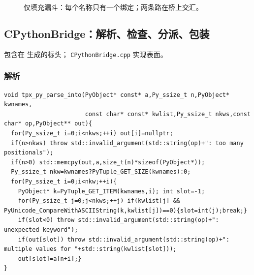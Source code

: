 \begin{figure}[H]
\centering
{}
\caption{仅填充漏斗：每个名称只有一个绑定；两条路在桥上交汇。}
\label{fig:dualfunnel}
\end{figure}

\subsection{CPythonBridge：解析、检查、分派、包装}
\label{sec:bridge}

包含在
生成的标头； \texttt{CPythonBridge.cpp} 实现表面。

\subsubsection{解析}

\begin{lstlisting}[caption={zero-alloc merge.}, label=lst:parseinto]
void tpx_py_parse_into(PyObject* const* a,Py_ssize_t n,PyObject* kwnames,
                       const char* const* kwlist,Py_ssize_t nkws,const char* op,PyObject** out){
  for(Py_ssize_t i=0;i<nkws;++i) out[i]=nullptr;
  if(n>nkws) throw std::invalid_argument(std::string(op)+": too many positionals");
  if(n>0) std::memcpy(out,a,size_t(n)*sizeof(PyObject*));
  Py_ssize_t nkw=kwnames?PyTuple_GET_SIZE(kwnames):0;
  for(Py_ssize_t i=0;i<nkw;++i){
    PyObject* k=PyTuple_GET_ITEM(kwnames,i); int slot=-1;
    for(Py_ssize_t j=0;j<nkws;++j) if(kwlist[j] && PyUnicode_CompareWithASCIIString(k,kwlist[j])==0){slot=int(j);break;}
    if(slot<0) throw std::invalid_argument(std::string(op)+": unexpected keyword");
    if(out[slot]) throw std::invalid_argument(std::string(op)+": multiple values for "+std::string(kwlist[slot]));
    out[slot]=a[n+i];}
}
\end{lstlisting}

